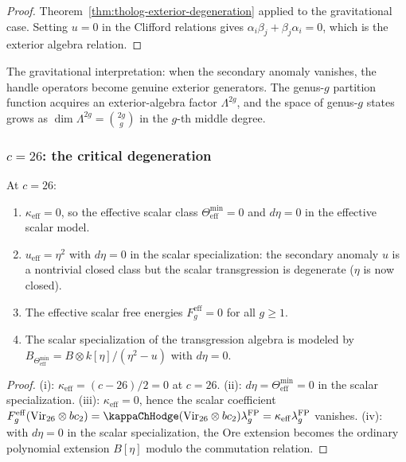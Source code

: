 \begin{proof}
Theorem~\ref{thm:tholog-exterior-degeneration} applied to the
gravitational case. Setting $u = 0$ in the Clifford relations
gives $\alpha_i\beta_j + \beta_j\alpha_i = 0$, which is the
exterior algebra relation.
\end{proof}

The gravitational interpretation: when the secondary anomaly
vanishes, the handle operators become genuine exterior generators.
The genus-$g$ partition function acquires an exterior-algebra
factor $\Lambda^{2g}$, and the space of genus-$g$ states grows
as $\dim \Lambda^{2g} = \binom{2g}{g}$ in the $g$-th middle
degree.

\subsubsection*{$c = 26$: the critical degeneration}

\begin{proposition}
\label{prop:gravity-c26-degeneration}
At $c = 26$:
\begin{enumerate}[label=\textup{(\roman*)}]
\item $\kappa_{\mathrm{eff}} = 0$, so the effective scalar class
 $\Theta_{\mathrm{eff}}^{\min} = 0$ and $d\eta = 0$ in the
 effective scalar model.
\item $u_{\mathrm{eff}} = \eta^2$ with $d\eta = 0$
 in the scalar specialization:
 the secondary anomaly $u$ is a nontrivial closed class but
 the scalar transgression is degenerate ($\eta$ is now closed).
\item The effective scalar free energies
 $F_g^{\mathrm{eff}} = 0$ for all $g \ge 1$.
\item The scalar specialization of the transgression algebra is
 modeled by
 $B_{\Theta_{\mathrm{eff}}^{\min}}
 = B \otimes k[\eta]/(\eta^2 - u)$
 with $d\eta = 0$.
\end{enumerate}
\end{proposition}

\begin{proof}
(i): $\kappa_{\mathrm{eff}} = (c-26)/2 = 0$ at $c = 26$.
(ii): $d\eta = \Theta_{\mathrm{eff}}^{\min} = 0$ in the scalar
specialization.
(iii): $\kappa_{\mathrm{eff}} = 0$, hence the scalar coefficient
$F_g^{\mathrm{eff}}(\mathrm{Vir}_{26}\otimes bc_2)
= \kappaChHodge(\mathrm{Vir}_{26}\otimes bc_2)\lambda_g^{\mathrm{FP}}
= \kappa_{\mathrm{eff}}\lambda_g^{\mathrm{FP}}$ vanishes.
(iv): with $d\eta = 0$ in the scalar specialization, the Ore extension becomes the ordinary
polynomial extension $B[\eta]$ modulo the commutation relation.
\end{proof}

